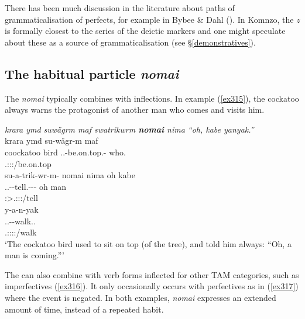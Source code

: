 There has been much discussion in the literature about paths of grammaticalisation of perfects, for example in Bybee \& Dahl (\citeyear{Bybee:1989hk}). In Komnzo, the   \emph{z} is formally closest to the  series of the deictic markers and one might speculate about these as a source of grammaticalisation (see \S\ref{demonstratives}).

\subsection{The habitual particle \emph{nomai}}\label{habitualnomai}

The   \emph{nomai} typically combines with  inflections. In example (\ref{ex315}), the cockatoo always warns the protagonist of another man who comes and visits him.

\begin{exe}
	\ex \emph{krara ymd suwägrm maf swatrikwrm \textbf{nomai} nima ``oh, kabe yanyak.''}\\
	\glll krara ymd su-wägr-m maf\\
	coockatoo bird \Tsg.\Masc.\Betaone-be.on.top.\Ndu-\Dur{} who.\Erg{}\\
	{} {} \footnotesize{\Tsg.\Masc:\Sbj:\Pst:\Dur/be.on.top} {}\\
	\sn
	\glll su-a-trik-wr-m-\Zero{} nomai nima oh kabe\\
	\Tsg.\Masc.\Betaone-\Vc-tell.\Ext-\Ndu-\Dur-\Stsg{} \Hab{} \Quot{} oh man\\
	\footnotesize{\Stsg:\Sbj>\Tsg.\Masc:\Io:\Pst:\Dur/tell} {} {} {} {}\\
	\sn
	\glll y-a-n-yak\\
	\Tsg.\Masc.\Alph-\Venit-walk.\Ext.\Ndu{}\\
	\footnotesize{\Tsg.\Masc:\Sbj:\Nonpast:\Ipfv:\Venit/walk}\\
	\trans `The cockatoo bird used to sit on top (of the tree), and told him always: ``Oh, a man is coming.'''
	\label{ex315}
\end{exe}

The  can also combine with verb forms inflected for other TAM categories, such as imperfectives (\ref{ex316}). It only occasionally occurs with perfectives as in (\ref{ex317}) where the event is negated. In both examples, \emph{nomai} expresses an extended amount of time, instead of a repeated habit.

